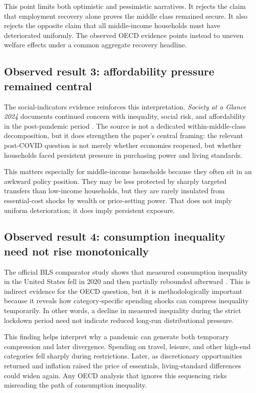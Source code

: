 \documentclass[11pt]{article}
\begin{document}
This point limits both optimistic and pessimistic narratives. It rejects the claim that employment recovery alone proves the middle class remained secure. It also rejects the opposite claim that all middle-income households must have deteriorated uniformly. The observed OECD evidence points instead to uneven welfare effects under a common aggregate recovery headline.

\subsection{Observed result 3: affordability pressure remained central}
The social-indicators evidence reinforces this interpretation. \emph{Society at a Glance 2024} documents continued concern with inequality, social risk, and affordability in the post-pandemic period \citep{societyataglance202024bolletti}. The source is not a dedicated within-middle-class decomposition, but it does strengthen the paper's central framing: the relevant post-COVID question is not merely whether economies reopened, but whether households faced persistent pressure in purchasing power and living standards.

This matters especially for middle-income households because they often sit in an awkward policy position. They may be less protected by sharply targeted transfers than low-income households, but they are rarely insulated from essential-cost shocks by wealth or price-setting power. That does not imply uniform deterioration; it does imply persistent exposure.

\subsection{Observed result 4: consumption inequality need not rise monotonically}
The official BLS comparator study shows that measured consumption inequality in the United States fell in 2020 and then partially rebounded afterward \citep{consumptioninequal2024bls}. This is indirect evidence for the OECD question, but it is methodologically important because it reveals how category-specific spending shocks can compress inequality temporarily. In other words, a decline in measured inequality during the strict lockdown period need not indicate reduced long-run distributional pressure.

This finding helps interpret why a pandemic can generate both temporary compression and later divergence. Spending on travel, leisure, and other high-end categories fell sharply during restrictions. Later, as discretionary opportunities returned and inflation raised the price of essentials, living-standard differences could widen again. Any OECD analysis that ignores this sequencing risks misreading the path of consumption inequality.
\end{document}
